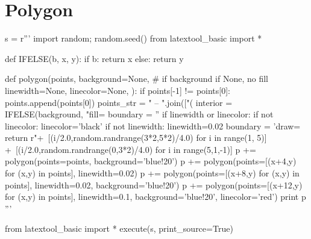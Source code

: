 \section{Polygon}

\begin{python}
s = r'''
import random; random.seed()
from latextool_basic import *

def IFELSE(b, x, y):
    if b: return x
    else: return y
    
def polygon(points,
            background=None, # if background if None, no fill
            linewidth=None,
            linecolor=None,
            ):
    if points[-1] != points[0]: points.append(points[0])
    points_str = " -- ".join(["(%
    interior = IFELSE(background, "fill=%
    boundary = ''
    if linewidth or linecolor:
        if not linecolor: linecolor='black'
        if not linewidth: linewidth=0.02
        boundary = 'draw=%
    return r" +\
         [(i/2.0,random.randrange(3*2,5*2)/4.0) for i in range(1, 5)] +\
         [(i/2.0,random.randrange(0,3*2)/4.0) for i in range(5,1,-1)]      
p += polygon(points=points, background='blue!20')
p += polygon(points=[(x+4,y) for (x,y) in points], linewidth=0.02)
p += polygon(points=[(x+8,y) for (x,y) in points], linewidth=0.02,
             background='blue!20')
p += polygon(points=[(x+12,y) for (x,y) in points], linewidth=0.1,
             background='blue!20', linecolor='red')
print p
'''

from latextool_basic import *
execute(s, print_source=True)
\end{python}
